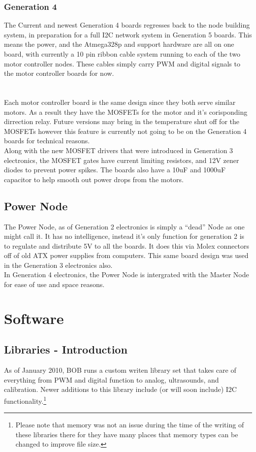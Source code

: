 \documentclass{article}
\begin{document}
\subsubsection{Generation 4}
The Current and newest Generation 4 boards regresses back to the node building system, in preparation for a full I2C network system in Generation 5 boards. This means the power, and the Atmega328p and support hardware are all on one board, with currently a 10 pin ribbon cable system running to each of the two motor controller nodes. These cables simply carry PWM and digital signals to the motor controller boards for now.\\
\\
\\
Each motor controller board is the same design since they both serve similar motors. As a result they have the MOSFETs for the motor and it's corisponding dirrection relay. Future versions may bring in the temperature shut off for the MOSFETs however this feature is currently not going to be on the Generation 4 boards for technical reasons.\\
Along with the new MOSFET drivers that were introduced in Generation 3 electronics, the MOSFET gates have current limiting resistors, and 12V zener diodes to prevent power spikes. The boards also have a 10uF and 1000uF capacitor to help smooth out power drops from the motors.\\
\subsection{Power Node}
The Power Node, as of Generation 2 electronics is simply a “dead” Node as one might call it. It has no intelligence, instead it's only function for generation 2 is to regulate and distribute 5V to all the boards. It does this via Molex connectors off of old ATX power supplies from computers. This same board design was used in the Generation 3 electronics also.\\
In Generation 4 electronics, the Power Node is intergrated with the Master Node for ease of use and space reasons.\\
\section{Software}
\subsection{Libraries - Introduction}
As of January 2010, BOB runs a custom writen library set that takes care of everything from PWM and digital function to analog, ultrasounds, and calibration. Newer additions to this library include (or will soon include) I2C functionality.\footnote{Please note that memory was not an issue during the time of the writing of these libraries there for they have many places that memory types can be changed to improve file size.}\\
\end{document}

